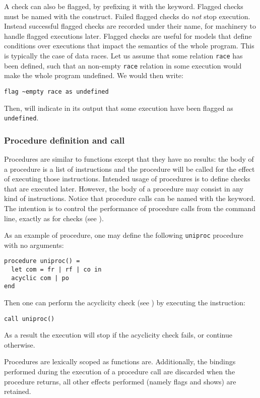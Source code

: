 A check can also be flagged, by prefixing it with the 
keyword. Flagged checks must be named with the  construct.
Failed flagged checks do \emph{not} stop execution.
Instead successful flagged checks are recorded under their name,
for \herd{} machinery to handle flagged executions later.
Flagged checks are useful for models that define conditions
over executions that impact the semantics of the whole program.
This is typically the case of data races.
Let us assume that some relation \verb+race+ has been defined,
such that an non-empty \verb+race+ relation in  some execution
would make the whole program undefined. We would then write:
\begin{verbatim}
flag ~empty race as undefined
\end{verbatim}
Then, \herd{} will indicate in its output that some
execution have been flagged as \verb+undefined+.

\subsubsection*{Procedure definition and call}
Procedures are similar to functions except that they have no results:
the body of a procedure is a list of instructions
and the procedure will be called for the effect of executing
those instructions. Intended usage of procedures is to define checks
that are executed later. However, the body of a procedure may
consist in any kind of instructions.
Notice that procedure calls can be named with the  keyword.
The intention is to control the performance of procedure calls
from  the command line, exactly as for checks (see
).


As an example of procedure,
one may define the following \verb+uniproc+ procedure with
no arguments:
\begin{verbatim}
procedure uniproc() =
  let com = fr | rf | co in
  acyclic com | po
end
\end{verbatim}
Then one can perform the acyclicity check (see
) by executing the instruction:
\begin{verbatim}
call uniproc()
\end{verbatim}
As a result the execution will stop if the acyclicity check fails,
or continue otherwise.

Procedures are lexically scoped as functions are.
Additionally, the bindings performed during the execution of a procedure call
are discarded when the procedure returns, all other effects performed
(namely flags and shows) are retained.

